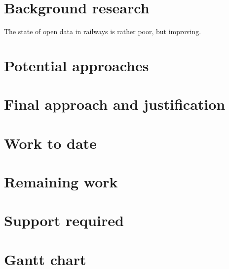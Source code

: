 \documentclass[a4paper,12pt]{article}
\begin{document}
\section{Background research}

The state of open data in railways is rather poor, but improving. 

\section{Potential approaches}

\section{Final approach and justification}

\section{Work to date}

\section{Remaining work}

\section{Support required}

\section{Gantt chart}




\end{document}
